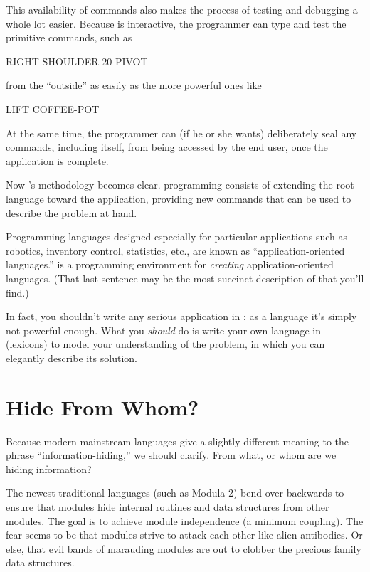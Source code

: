 This availability of commands also makes the process of testing and
debugging a whole lot easier. Because \Forth{} is interactive, the
programmer can type and test the primitive commands, such as
\begin{Code}
RIGHT SHOULDER 20 PIVOT
\end{Code}
from the ``outside'' as easily as the more powerful ones like

\begin{Code}
LIFT COFFEE-POT
\end{Code}
At the same time, the programmer can (if he or she wants) deliberately
seal any commands, including \Forth{} itself, from being accessed by the
end user, once the application is complete.

Now \Forth{}'s methodology becomes clear. \Forth{} programming consists of
extending the root language toward the application, providing new
commands that can be used to describe the problem at hand.

Programming languages designed especially for particular applications
such as robotics, inventory control, statistics, etc., are known as
``application-oriented languages.'' \Forth{} is a programming environment
for \emph{creating} app\-li\-ca\-tion-oriented languages. (That last
sentence may be the most succinct description of \Forth{} that you'll
find.)

In fact, you shouldn't write any serious application in \Forth{}; as a
language it's simply not powerful enough. What you \emph{should} do is
write your own language in \Forth{} (lexicons) to model your
understanding of the problem, in which you can elegantly describe its
solution.


\section{Hide From Whom?}%
%
Because modern mainstream languages give a slightly different meaning
to the phrase ``information-hiding,'' we should clarify. From what, or
whom are we hiding information?

The newest traditional languages (such as Modula 2) bend over
backwards to ensure that modules hide internal routines and data
structures from other modules. The goal is to achieve module
independence (a minimum coupling). The fear seems to be that modules
strive to attack each other like alien antibodies. Or else, that evil
bands of marauding modules are out to clobber the precious family data
structures.

